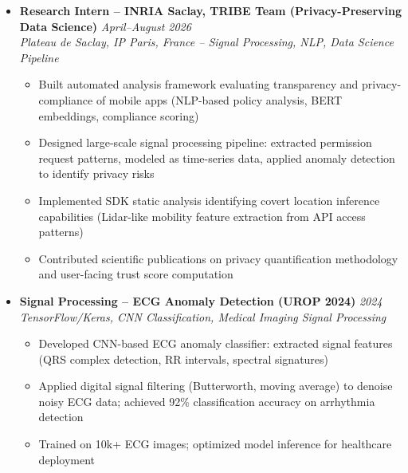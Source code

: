 \documentclass[a4paper,11pt]{article}
\begin{document}
\begin{itemize}[leftmargin=*, label={-}]

\item \textbf{Research Intern -- INRIA Saclay, TRIBE Team (Privacy-Preserving Data Science)} \hfill \textit{April--August 2026} \\
\textit{Plateau de Saclay, IP Paris, France -- Signal Processing, NLP, Data Science Pipeline} \vspace{-2pt}
    \begin{itemize}[leftmargin=0.4cm, nosep, label=\tiny$\bullet$]
        \item Built automated analysis framework evaluating transparency and privacy-compliance of mobile apps (NLP-based policy analysis, BERT embeddings, compliance scoring)
        \item Designed large-scale signal processing pipeline: extracted permission request patterns, modeled as time-series data, applied anomaly detection to identify privacy risks
        \item Implemented SDK static analysis identifying covert location inference capabilities (Lidar-like mobility feature extraction from API access patterns)
        \item Contributed scientific publications on privacy quantification methodology and user-facing trust score computation
    \end{itemize}

\item \textbf{Signal Processing -- ECG Anomaly Detection (UROP 2024)} \hfill \textit{2024} \\
\textit{TensorFlow/Keras, CNN Classification, Medical Imaging Signal Processing} \vspace{-2pt}
    \begin{itemize}[leftmargin=0.4cm, nosep, label=\tiny$\bullet$]
        \item Developed CNN-based ECG anomaly classifier: extracted signal features (QRS complex detection, RR intervals, spectral signatures)
        \item Applied digital signal filtering (Butterworth, moving average) to denoise noisy ECG data; achieved 92\% classification accuracy on arrhythmia detection
        \item Trained on 10k+ ECG images; optimized model inference for healthcare deployment
    \end{itemize}


\end{itemize}
\end{document}

